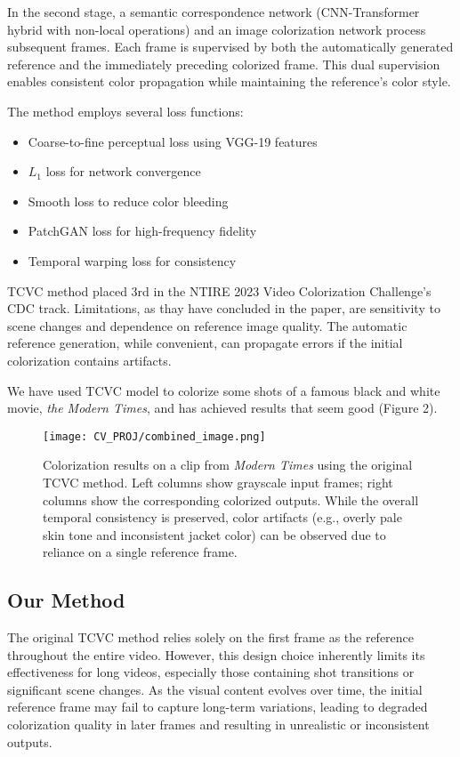 \documentclass[10pt,twocolumn,letterpaper]{article}
\begin{document}
In the second stage, a semantic correspondence network (CNN-Transformer hybrid with non-local operations) and an image colorization network process subsequent frames. Each frame is supervised by both the automatically generated reference and the immediately preceding colorized frame. This dual supervision enables consistent color propagation while maintaining the reference's color style.

The method employs several loss functions:
\begin{itemize}
\item Coarse-to-fine perceptual loss using VGG-19 features
\item $L_1$ loss for network convergence
\item Smooth loss to reduce color bleeding
\item PatchGAN loss for high-frequency fidelity
\item Temporal warping loss for consistency
\end{itemize}

TCVC method placed 3rd in the NTIRE 2023 Video Colorization Challenge's CDC track. Limitations, as thay have concluded in the paper, are sensitivity to scene changes and dependence on reference image quality. The automatic reference generation, while convenient, can propagate errors if the initial colorization contains artifacts.

We have used TCVC model to colorize some shots of a famous black and white movie, \textit{the Modern Times}, and has achieved results that seem good (Figure 2).

\begin{figure}
    \centering
    \texttt{[image: CV\_PROJ/combined\_image.png]}
    \caption{Colorization results on a clip from \textit{Modern Times} using the original TCVC method. Left columns show grayscale input frames; right columns show the corresponding colorized outputs. While the overall temporal consistency is preserved, color artifacts (e.g., overly pale skin tone and inconsistent jacket color) can be observed due to reliance on a single reference frame.}

    \label{fig:combined_image}
\end{figure}

\subsection{Our Method}
The original TCVC method relies solely on the first frame as the reference throughout the entire video. However, this design choice inherently limits its effectiveness for long videos, especially those containing shot transitions or significant scene changes. As the visual content evolves over time, the initial reference frame may fail to capture long-term variations, leading to degraded colorization quality in later frames and resulting in unrealistic or inconsistent outputs.
\end{document}
